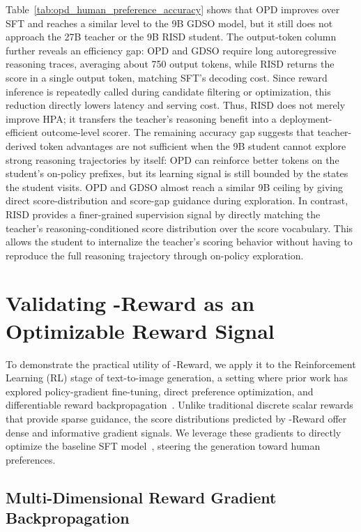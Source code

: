 \documentclass{llmxive}
\providecommand{\mname}{\twemoji[width=0.75em]{zap}-Reward\xspace}
\providecommand{\teaname}{GDSO\xspace}
\providecommand{\stuname}{RISD\xspace}
\begin{document}
Table~\ref{tab:opd_human_preference_accuracy} shows that OPD improves over SFT and reaches a similar level to the 9B \teaname model, but it still does not approach the 27B teacher or the 9B \stuname student.
The output-token column further reveals an efficiency gap: OPD and \teaname require long autoregressive reasoning traces, averaging about 750 output tokens, while \stuname returns the score in a single output token, matching SFT's decoding cost. Since reward inference is repeatedly called during candidate filtering or optimization, this reduction directly lowers latency and serving cost. Thus, \stuname does not merely improve HPA; it transfers the teacher's reasoning benefit into a deployment-efficient outcome-level scorer. The remaining accuracy gap suggests that teacher-derived token advantages are not sufficient when the 9B student cannot explore strong reasoning trajectories by itself: OPD can reinforce better tokens on the student's on-policy prefixes, but its learning signal is still bounded by the states the student visits. OPD and \teaname almost reach a similar 9B ceiling by giving direct score-distribution and score-gap guidance during exploration. In contrast, \stuname provides a finer-grained supervision signal by directly matching the teacher's reasoning-conditioned score distribution over the score vocabulary. This allows the student to internalize the teacher's scoring behavior without having to reproduce the full reasoning trajectory through on-policy exploration.


\section{Validating \mname as an Optimizable Reward Signal}
\label{sec:reward_feedback_learning} 


To demonstrate the practical utility of \mname, we apply it to the Reinforcement Learning (RL) stage of text-to-image generation, a setting where prior work has explored policy-gradient fine-tuning, direct preference optimization, and differentiable reward backpropagation~\cite{fan2023dpok,wallace2024diffusion,prabhudesai2024alignprop,clark2024directlyfinetuningdiffusionmodels}. Unlike traditional discrete scalar rewards that provide sparse guidance, the score distributions predicted by \mname offer dense and informative gradient signals. We leverage these gradients to directly optimize the baseline SFT model~\cite{Team2025ZImageAE}, steering the generation toward human preferences.

\subsection{Multi-Dimensional Reward Gradient Backpropagation}
\end{document}
